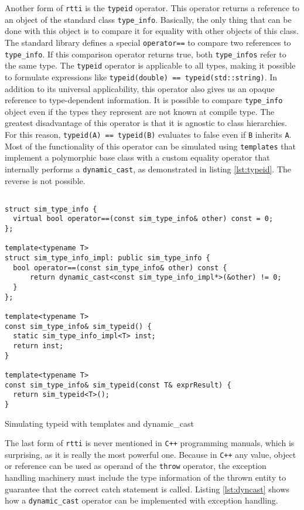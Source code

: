 Another form of \texttt{rtti} is the \texttt{typeid} operator. This operator returns a reference to an object of the standard class
\texttt{type\_info}. Basically, the only thing that can be done with this object is to compare it for equality with other objects of
this class. The standard library defines a special \texttt{operator==} to compare two references to \texttt{type\_info}. If this
comparison operator returns true, both \texttt{type\_infos} refer to the same type. The \texttt{typeid} operator is applicable to all
types, making it possible to formulate expressions like \verb|typeid(double) == typeid(std::string)|. In addition to its universal
applicability, this operator also gives us an opaque reference to type-dependent information. It is possible to compare
\texttt{type\_info} object even if the types they represent are not known at compile type. The greatest disadvantage of this
operator is that it is agnostic to class hierarchies. For this reason, \verb|typeid(A) == typeid(B)| evaluates to false even if
\texttt{B} inherits \texttt{A}. Most of the functionality of this operator can be simulated using \texttt{templates} that implement
a polymorphic base class with a custom equality operator that internally performs a \texttt{dynamic\_cast}, as demonstrated in
listing \ref{lst:typeid}. The reverse is not possible.

\begin{listing}[H]
\begin{verbatim}
 
struct sim_type_info {
  virtual bool operator==(const sim_type_info& other) const = 0;
};

template<typename T>
struct sim_type_info_impl: public sim_type_info {
  bool operator==(const sim_type_info& other) const {
      return dynamic_cast<const sim_type_info_impl*>(&other) != 0;
  }
};

template<typename T>
const sim_type_info& sim_typeid() {
  static sim_type_info_impl<T> inst;
  return inst;
}  

template<typename T>
const sim_type_info& sim_typeid(const T& exprResult) {
  return sim_typeid<T>();
}
\end{verbatim}
\caption{Simulating typeid with templates and dynamic\_cast}
\label{lst:typeid}
\end{listing}

The last form of \texttt{rtti} is never mentioned in \texttt{C++} programming manuals, which is surprising, as it is really the most powerful one.
Because in \texttt{C++} any value, object or reference can be used as operand of the \texttt{throw} operator, the exception handling
machinery must include the type information of the thrown entity to guarantee that the correct catch statement is called.
Listing \ref{lst:dyncast} shows how a \texttt{dynamic\_cast} operator can be implemented with exception handling.

